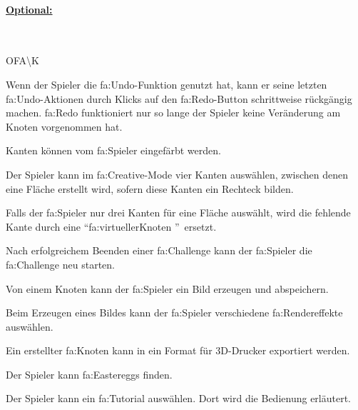 %
%
\paragraph*{\underline{Optional:}}~\\


\begin{ids}{\gls{OFA\K}}

	\id[ 190] Wenn der Spieler die \gls{fa:Undo}-Funktion genutzt hat, kann er seine letzten \gls{fa:Undo}-Aktionen durch Klicks auf den \gls{fa:Redo}-Button schrittweise rückgängig machen. {\gls{fa:Redo}} funktioniert nur so lange der Spieler keine Veränderung am Knoten vorgenommen hat.
	
 	\id[ 200] Kanten können vom \gls{fa:Spieler} eingefärbt werden.
 	
 	\id[ 210] Der Spieler kann im \gls{fa:Creative}-Mode vier Kanten auswählen, zwischen denen eine Fläche erstellt wird, sofern diese Kanten ein Rechteck bilden.
 	
 	\id[ 220] Falls der \gls{fa:Spieler} nur drei Kanten für eine Fläche auswählt, wird  die fehlende Kante durch eine \textquotedblleft \gls{fa:virtuellerKnoten} \textquotedblright~ersetzt.
 	
	\id [230] Nach erfolgreichem Beenden einer \gls{fa:Challenge} kann der \gls{fa:Spieler} die \gls{fa:Challenge} neu starten.
	
 	\id[ 240] Von einem Knoten kann der \gls{fa:Spieler} ein Bild erzeugen und abspeichern.
 	
 	\id[ 250] Beim Erzeugen eines Bildes kann der \gls{fa:Spieler} verschiedene \gls{fa:Rendereffekte} auswählen.
 	
 	\id[ 260] Ein erstellter \gls{fa:Knoten} kann in ein Format für 3D-Drucker exportiert werden.
 	
 	\id[ 270] Der Spieler kann \gls{fa:Easteregg}s finden.
 	
 	\id[ 275] Der Spieler kann ein \gls{fa:Tutorial} auswählen. Dort wird die Bedienung erläutert.
	
\end{ids}



